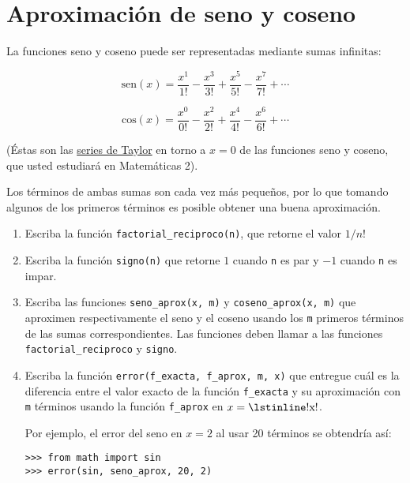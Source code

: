 \section{Aproximación de seno y coseno}

La funciones seno y coseno puede ser representadas mediante sumas
infinitas:

\[\text{sen}(x) =
\frac{x^1}{1!} -
\frac{x^3}{3!} +
\frac{x^5}{5!} -
\frac{x^7}{7!} +
\cdots\]

\[\text{cos}(x) =
\frac{x^0}{0!} -
\frac{x^2}{2!} +
\frac{x^4}{4!} -
\frac{x^6}{6!} +
\cdots\]

(Éstas son las
\href{http://es.wikipedia.org/wiki/Serie\_de\_Taylor}{series de Taylor}
en torno a \(x=0\) de las funciones seno y coseno, que usted estudiará en
Matemáticas 2).

Los términos de ambas sumas son cada vez más pequeños, por lo que
tomando algunos de los primeros términos es posible obtener una buena
aproximación.

\begin{enumerate}
\item
  Escriba la función \lstinline!factorial_reciproco(n)!, que retorne el
  valor \(1/n!\)
\item
  Escriba la función \lstinline!signo(n)! que retorne \(1\) cuando
  \lstinline!n! es par y \(-1\) cuando \lstinline!n! es impar.
\item
  Escriba las funciones \lstinline!seno_aprox(x, m)! y
  \lstinline!coseno_aprox(x, m)! que aproximen respectivamente el seno y
  el coseno usando los \lstinline!m! primeros términos de las sumas
  correspondientes. Las funciones deben llamar a las funciones
  \lstinline!factorial_reciproco! y \lstinline!signo!.
\item
  Escriba la función \lstinline!error(f_exacta, f_aprox, m, x)! que
  entregue cuál es la diferencia entre el valor exacto de la función
  \lstinline!f_exacta! y su aproximación con \lstinline!m! términos
  usando la función \lstinline!f_aprox! en \(x = \text{\lstinline!x!}\).

  Por ejemplo, el error del seno en \(x=2\) al usar 20 términos se
  obtendría así:

\begin{lstlisting}
>>> from math import sin
>>> error(sin, seno_aprox, 20, 2)
\end{lstlisting}
\end{enumerate}
